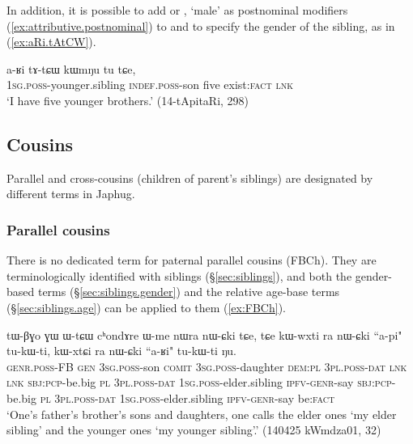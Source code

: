 In addition, it is possible to add  or , `male' as postnominal modifiers (\ref{ex:attributive.postnominal}) to  and  to specify the gender of the sibling, as in (\ref{ex:aRi.tAtCW}).

\begin{exe}
	\ex \label{ex:aRi.tAtCW}
	\gll a-ʁi tɤ-tɕɯ kɯmŋu tu tɕe, \\
	\textsc{1sg}.\textsc{poss}-younger.sibling \textsc{indef}.\textsc{poss}-son five exist:\textsc{fact} \textsc{lnk} \\
	\glt `I have five younger brothers.' (14-tApitaRi, 298)
\end{exe}

  
                   
\subsection{Cousins} \label{sec:ego.cousins}
Parallel and cross-cousins (children of parent's siblings) are designated by different terms in Japhug.

\subsubsection{Parallel cousins} \label{sec:ego.parallel.cousins}
There is no dedicated term for paternal parallel cousins (FBCh). They are terminologically identified with siblings (§\ref{sec:siblings}), and both the gender-based terms (§\ref{sec:siblings.gender}) and the relative age-base terms (§\ref{sec:siblings.age}) can be applied to them (\ref{ex:FBCh}).

\begin{exe}
\ex \label{ex:FBCh}
\gll  tɯ-βɣo ɣɯ ɯ-tɕɯ cʰondɤre ɯ-me nɯra nɯ-ɕki tɕe, tɕe kɯ-wxti ra nɯ-ɕki ``a-pi" tu-kɯ-ti, kɯ-xtɕi ra nɯ-ɕki ``a-ʁi" tu-kɯ-ti ŋu. \\
\textsc{genr}.\textsc{poss}-FB \textsc{gen} \textsc{3sg}.\textsc{poss}-son \textsc{comit}  \textsc{3sg}.\textsc{poss}-daughter \textsc{dem}:\textsc{pl} \textsc{3pl}.\textsc{poss}-\textsc{dat} \textsc{lnk} \textsc{lnk} \textsc{sbj}:\textsc{pcp}-be.big \textsc{pl} \textsc{3pl}.\textsc{poss}-\textsc{dat} \textsc{1sg}.\textsc{poss}-elder.sibling \textsc{ipfv}-\textsc{genr}-say \textsc{sbj}:\textsc{pcp}-be.big \textsc{pl} \textsc{3pl}.\textsc{poss}-\textsc{dat} \textsc{1sg}.\textsc{poss}-elder.sibling \textsc{ipfv}-\textsc{genr}-say be:\textsc{fact} \\
\glt `One's father's brother's sons and daughters, one calls the elder ones  `my elder sibling' and the younger ones  `my younger sibling'.' (140425 kWmdza01, 32)
\end{exe}

